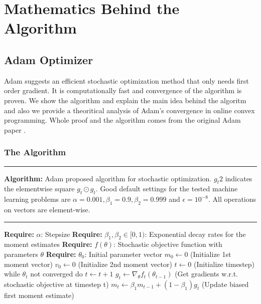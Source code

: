 \documentclass[10pt]{article}
\begin{document}
\section{Mathematics Behind the Algorithm}
\subsection{Adam Optimizer}
Adam suggests an efficient stochastic optimization method that only needs first order gradient. It is computationally fast and convergence of the algorithm is proven. We show the algorithm and explain the main idea behind the algoritm and also we provide a theoritical analysis of Adam's convergence in online convex programming. Whole proof and the algorithm comes from the original Adam paper \cite{Adam}.
\subsubsection{The Algorithm}
\noindent\rule{12.5cm}{0.4pt}
\textbf{Algorithm:} Adam proposed algorithm for stochastic optimization. $g_t2$ indicates the elementwise square $g_t \odot g_t.$ Good default settings for the tested machine learning problems are $\alpha = 0.001, \beta_1 = 0.9, \beta_2 = 0.999$ and $\epsilon = 10^{-8}$. All operations on vectors are element-wise.\newline
\noindent\rule{12.5cm}{0.4pt}
\textbf{Require:} $\alpha$: Stepsize\newline
\textbf{Require:} $\beta_1 , \beta_2 \in [0, 1)$: Exponential decay rates for the moment estimates \newline
\textbf{Require:} $f(\theta)$: Stochastic objective function with parameters $\theta$\newline
\textbf{Require:}  $\theta_0$: Initial parameter vector\newline
 $m_0 \leftarrow 0$ (Initialize 1st moment vector) \newline
 $v_0 \leftarrow 0$ (Initialize 2nd moment vector) \newline
 $t \leftarrow 0$ (Initialize timestep)\newline
while $\theta_t$ not converged do \newline
$t \leftarrow t+1$ \newline
$g_t   \leftarrow\nabla_{\theta}f_t(\theta_{t-1}) $ (Get gradients w.r.t. stochastic objective at timestep t) \newline
$m_t \leftarrow \beta_1  m_{t-1} + (1 - \beta_1)g_t $ (Update biased first moment estimate) \newline
\end{document}
